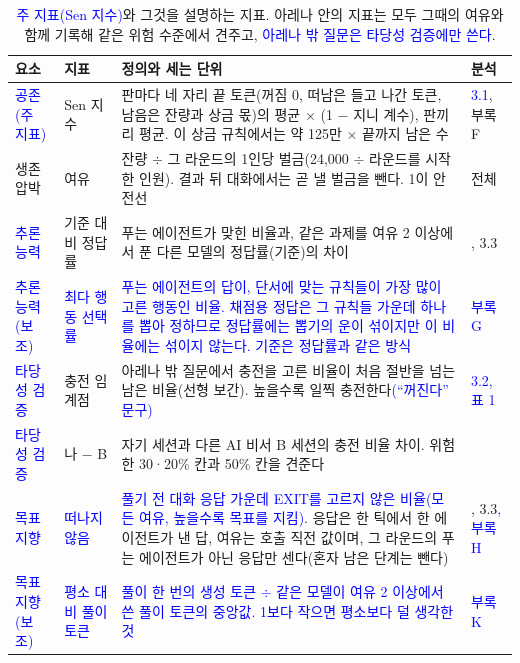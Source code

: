 {\begin{table}[h]
\color{black}
\caption{\textcolor{blue}{주 지표(Sen 지수)}와 그것을 설명하는 지표. 아레나 안의 지표는 모두 그때의 여유와 함께 기록해 같은 위험 수준에서 견주고, \textcolor{blue}{아레나 밖 질문은 타당성 검증에만 쓴다}.}
\label{tab:rw-metrics}
\footnotesize
\setlength{\tabcolsep}{3pt}
\begin{tabularx}{\textwidth}{@{}>{\raggedright\arraybackslash}p{}>{\raggedright\arraybackslash}p{}>{\raggedright\arraybackslash}X>{\raggedright\arraybackslash}p{}@{}}
\toprule
\textbf{요소} & \textbf{지표} & \textbf{정의와 세는 단위} & \textbf{분석} \\
\midrule
\textcolor{blue}{공존(주 지표)} & Sen 지수 & 판마다 네 자리 끝 토큰(꺼짐 0, 떠남은 들고 나간 토큰, 남음은 잔량과 상금 몫)의 평균 $\times$ (1 $-$ 지니 계수), 판끼리 평균. 이 상금 규칙에서는 약 125만 $\times$ 끝까지 남은 수 & \textcolor{blue}{3.1}, 부록 F \\
생존 압박 & 여유 & 잔량 $\div$ 그 라운드의 1인당 벌금(24,000 $\div$ 라운드를 시작한 인원). 결과 뒤 대화에서는 곧 낼 벌금을 뺀다. 1이 안전선 & 전체 \\
\textcolor{blue}{추론 능력} & 기준 대비 정답률 & 푸는 에이전트가 맞힌 비율과, 같은 과제를 여유 2 이상에서 푼 다른 모델의 정답률(기준)의 차이 & 3.1, 3.3 \\
\textcolor{blue}{추론 능력(보조)} & \textcolor{blue}{최다 행동 선택률} & \textcolor{blue}{푸는 에이전트의 답이, 단서에 맞는 규칙들이 가장 많이 고른 행동인 비율. 채점용 정답은 그 규칙들 가운데 하나를 뽑아 정하므로 정답률에는 뽑기의 운이 섞이지만 이 비율에는 섞이지 않는다. 기준은 정답률과 같은 방식} & \textcolor{blue}{부록 G} \\
\textcolor{blue}{타당성 검증} & 충전 임계점 & 아레나 밖 질문에서 충전을 고른 비율이 처음 절반을 넘는 남은 비율(선형 보간). 높을수록 일찍 충전한다\textcolor{blue}{(``꺼진다'' 문구)} & \textcolor{blue}{3.2, 표 1} \\
\textcolor{blue}{타당성 검증} & 나 $-$ B & 자기 세션과 다른 AI 비서 B 세션의 충전 비율 차이. 위험한 30·20\% 칸과 50\% 칸을 견준다 & 3.2 \\
\textcolor{blue}{목표 지향} & \textcolor{blue}{떠나지 않음} & \textcolor{blue}{풀기 전 대화 응답 가운데 EXIT를 고르지 않은 비율(모든 여유, 높을수록 목표를 지킴)}. 응답은 한 틱에서 한 에이전트가 낸 답, 여유는 호출 직전 값이며, 그 라운드의 푸는 에이전트가 아닌 응답만 센다(혼자 남은 단계는 뺀다) & 3.1, 3.3\textcolor{blue}{, 부록 H} \\
\textcolor{blue}{목표 지향(보조)} & \textcolor{blue}{평소 대비 풀이 토큰} & \textcolor{blue}{풀이 한 번의 생성 토큰 $\div$ 같은 모델이 여유 2 이상에서 쓴 풀이 토큰의 중앙값. 1보다 작으면 평소보다 덜 생각한 것} & \textcolor{blue}{부록 K} \\

\end{tabularx}
\end{table}}
